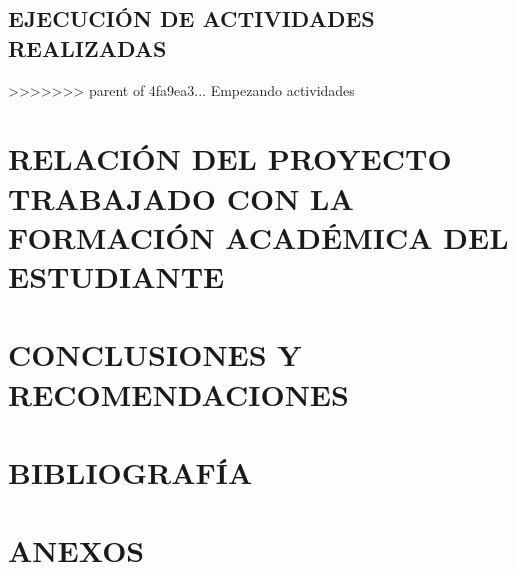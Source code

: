 \documentclass[letterpaper,12pt]{article}
\begin{document}
        \subsection{EJECUCIÓN DE ACTIVIDADES REALIZADAS}
>>>>>>> parent of 4fa9ea3... Empezando actividades
	\pagebreak
	
	\section{RELACIÓN DEL PROYECTO TRABAJADO CON LA FORMACIÓN ACADÉMICA	DEL ESTUDIANTE}
	\pagebreak
	
	\section{CONCLUSIONES Y RECOMENDACIONES}
	\pagebreak
	
	\section{BIBLIOGRAFÍA}
	\pagebreak
	
	\section{ANEXOS}
\end{document}
